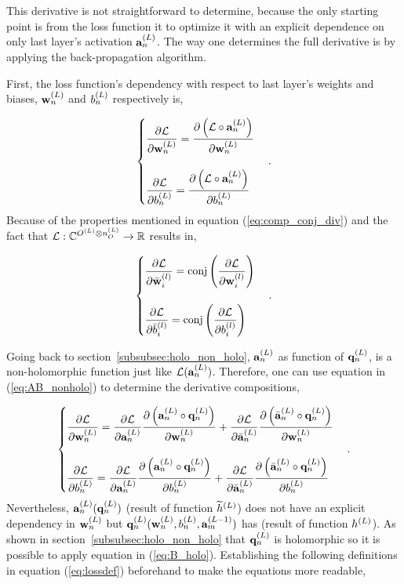 This derivative is not straightforward to determine, because the only starting point is from the loss function it to optimize it with an explicit dependence on only last layer's activation $ \act{L}{n} $. The way one determines the full derivative is by applying the back-propagation algorithm.

First, the loss function's dependency with respect to last layer's weights and biases, $ \w{L}{n} $ and $ \bi{L}{n} $ respectively is,

\begin{equation}
	\begin{cases}
		\der{\loss}{\w{L}{n}} = \der{\group{\loss \circ \act{L}{n}}}{\w{L}{n}} \\
		\\
		 \der{\loss}{\bi{L}{n}} = \der{\group{\loss \circ \act{L}{n}}}{\bi{L}{n}}
	\end{cases}.
\end{equation}
Because of the properties mentioned in equation (\ref{eq:comp_conj_div}) and the fact that $ \func[\loss]{\set{C}^{\outsp{L} \otimes \outs{L}}}{\set{R}} $ results in,

\begin{equation}
	\begin{cases}
		\der{\loss}{\cw{l}{i}} = \text{conj}\group{\der{\loss}{\w{l}{i}}} \\
		\\
		\der{\loss}{\cbi{l}{i}} = \text{conj}\group{\der{\loss}{\bi{l}{i}}}
	\end{cases}.
\end{equation}

Going back to section~\ref{subsubsec:holo_non_holo}, $ \act{L}{n} $  as function of $ \pact{L}{n} $, is a non-holomorphic function just like $ \loss(\act{L}{n})  $. Therefore, one can use equation in (\ref{eq:AB_nonholo}) to determine the derivative compositions,

\begin{equation}
	\begin{cases}
		\der{\loss}{\w{L}{n}} = \der{\loss}{\act{L}{n}}\der{\group{\act{L}{n} \circ \pact{L}{n}}}{\w{L}{n}} + \der{\loss}{\cact{L}{n}}\der{\group{\cact{L}{n} \circ \pact{L}{n}}}{\w{L}{n}} \\
		\\
		\der{\loss}{\bi{L}{n}} = \der{\loss}{\act{L}{n}}\der{\group{\act{L}{n} \circ \pact{L}{n}}}{\bi{L}{n}} + 	\der{\loss}{\cact{L}{n}}\der{\group{\cact{L}{n} \circ \pact{L}{n}}}{\bi{L}{n}} 
	\end{cases}.
\end{equation}
Nevertheless, $ \act{L}{n}(\pact{L}{n}) $ (result of function $ \paf{L} $) does not have an explicit dependency in $ \w{L}{n} $ but $ \pact{L}{n}(\w{L}{n}, \bi{L}{n}, \act{L-1}{m}) $ has (result of function $ \af{L} $). As  shown in section~\ref{subsubsec:holo_non_holo} that $ \pact{L}{n} $ is holomorphic so it is possible to apply equation in (\ref{eq:B_holo}). Establishing the following definitions in equation (\ref{eq:lossdef}) beforehand to make the equations more readable,


